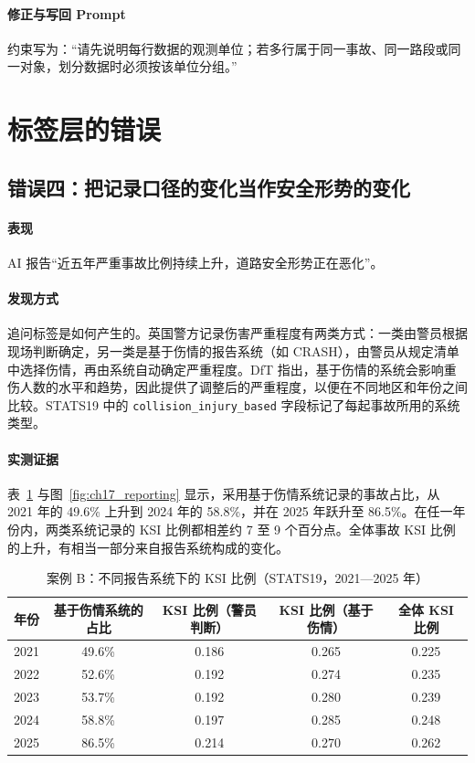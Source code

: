 \paragraph{修正与写回 Prompt} 约束写为：“请先说明每行数据的观测单位；若多行属于同一事故、同一路段或同一对象，划分数据时必须按该单位分组。”

\section{标签层的错误}

\subsection{错误四：把记录口径的变化当作安全形势的变化}

\paragraph{表现} AI 报告“近五年严重事故比例持续上升，道路安全形势正在恶化”。

\paragraph{发现方式} 追问标签是如何产生的。英国警方记录伤害严重程度有两类方式：一类由警员根据现场判断确定，另一类是基于伤情的报告系统（如 CRASH），由警员从规定清单中选择伤情，再由系统自动确定严重程度。DfT 指出，基于伤情的系统会影响重伤人数的水平和趋势，因此提供了调整后的严重程度，以便在不同地区和年份之间比较\cite{dft2019severity}。STATS19 中的 \texttt{collision\_injury\_based} 字段标记了每起事故所用的系统类型。

\paragraph{实测证据} 表~\ref{tab:ch17_reporting} 与图~\ref{fig:ch17_reporting} 显示，采用基于伤情系统记录的事故占比，从 2021 年的 49.6\% 上升到 2024 年的 58.8\%，并在 2025 年跃升至 86.5\%。在任一年份内，两类系统记录的 KSI 比例都相差约 7 至 9 个百分点。全体事故 KSI 比例的上升，有相当一部分来自报告系统构成的变化。

\begin{table}[H]
\centering
\caption{案例 B：不同报告系统下的 KSI 比例（STATS19，2021—2025 年）}
\label{tab:ch17_reporting}
\begin{tabular}{lcccc}
\toprule
年份 & 基于伤情系统的占比 & KSI 比例（警员判断） & KSI 比例（基于伤情） & 全体 KSI 比例 \\
\midrule
2021 & 49.6\% & 0.186 & 0.265 & 0.225 \\
2022 & 52.6\% & 0.192 & 0.274 & 0.235 \\
2023 & 53.7\% & 0.192 & 0.280 & 0.239 \\
2024 & 58.8\% & 0.197 & 0.285 & 0.248 \\
2025 & 86.5\% & 0.214 & 0.270 & 0.262 \\
\bottomrule
\end{tabular}
\end{table}

